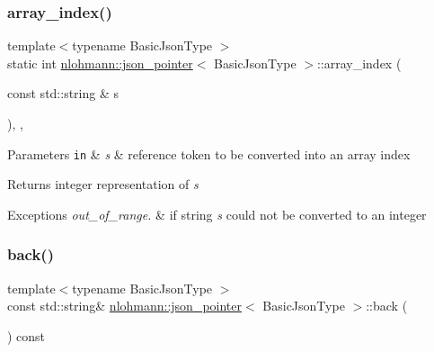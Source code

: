 \subsubsection{\texorpdfstring{array\+\_\+index()}{array\_index()}}
{\footnotesize\ttfamily template$<$typename Basic\+Json\+Type $>$ \\
static int \mbox{\hyperlink{classnlohmann_1_1json__pointer}{nlohmann\+::json\+\_\+pointer}}$<$ Basic\+Json\+Type $>$\+::array\+\_\+index (\begin{DoxyParamCaption}\item[{const std\+::string \&}]{s }\end{DoxyParamCaption})\hspace{0.3cm}{\ttfamily [inline]}, {\ttfamily [static]}, {\ttfamily [private]}}


\begin{DoxyParams}[1]{Parameters}
\mbox{\tt in}  & {\em s} & reference token to be converted into an array index\\
\hline
\end{DoxyParams}
\begin{DoxyReturn}{Returns}
integer representation of {\itshape s} 
\end{DoxyReturn}

\begin{DoxyExceptions}{Exceptions}
{\em out\+\_\+of\+\_\+range.} & if string {\itshape s} could not be converted to an integer \\
\hline
\end{DoxyExceptions}
\mbox{\label{classnlohmann_1_1json__pointer_a213bc67c32a30c68ac6bf06f5195d482}} 
\subsubsection{\texorpdfstring{back()}{back()}}
{\footnotesize\ttfamily template$<$typename Basic\+Json\+Type $>$ \\
const std\+::string\& \mbox{\hyperlink{classnlohmann_1_1json__pointer}{nlohmann\+::json\+\_\+pointer}}$<$ Basic\+Json\+Type $>$\+::back (\begin{DoxyParamCaption}{ }\end{DoxyParamCaption}) const\hspace{0.3cm}{\ttfamily [inline]}}



